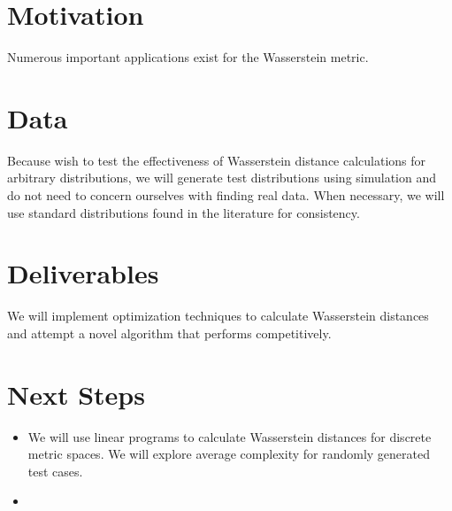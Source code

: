 \documentclass[a4paper]{amsart}
\begin{document}
\section{Motivation}

Numerous important applications exist for the Wasserstein metric. 

\section{Data}

Because wish to test the effectiveness of Wasserstein distance calculations for
arbitrary distributions, we will generate test distributions using simulation
and do not need to concern ourselves with finding real data. When necessary, we
will use standard distributions found in the literature for consistency.

\section{Deliverables}

We will implement optimization techniques to calculate Wasserstein distances and
attempt a novel algorithm that performs competitively.

\section{Next Steps}

\begin{itemize}

\item We will use linear programs to calculate Wasserstein distances for
discrete metric spaces. We will explore average complexity for randomly
generated test cases.

\item 

\end{itemize}

\end{document}
